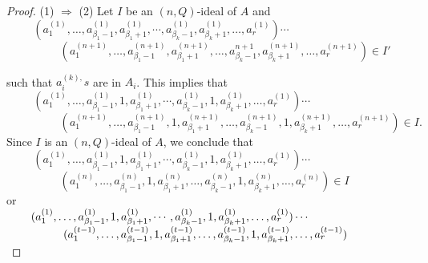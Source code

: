 \documentclass[preprint,review,10pt]{amsart}
\theoremstyle{definition}
\theoremstyle{remark}
\numberwithin{equation}{section}
\begin{document}
\begin{proof}
(1) $\Longrightarrow$ (2) Let $I$ be an $(n,Q)$-ideal of $A$ and \\

$\hspace{1cm} (a^{(1)}_1,\ldots,a^{(1)}_{\beta_1-1}, a^{(1)}_{\beta_1+1},\cdots, a^{(1)}_{\beta_k-1}, a^{(1)}_{\beta_k+1}, \dots,a_r^{(1)})\cdots$\\

$\hspace{2cm}(a^{(n+1)}_1,\ldots,a^{(n+1)}_{\beta_1-1}, a^{(n+1)}_{\beta_1+1},\ldots, a^{n+1}_{\beta_k-1}, a^{(n+1)}_{\beta_k+1},\ldots,a_r^{(n+1)}) \in I'$

such that  $a_i^{(k),}s$  are in $A_i$. This implies that\\

$\hspace{1cm} (a^{(1)}_1,\ldots,a^{(1)}_{\beta_1-1}, 1, a^{(1)}_{\beta_1+1},\cdots, a^{(1)}_{\beta_k-1}, 1,a^{(1)}_{\beta_k+1}, \dots,a_r^{(1)})\cdots$\\

$\hspace{2cm}(a^{(n+1)}_1,\ldots,a^{(n+1)}_{\beta_1-1},1, a^{(n+1)}_{\beta_1+1},\ldots, a^{(n+1)}_{\beta_k-1},1, a^{(n+1)}_{\beta_k+1},\ldots,a_r^{(n+1)}) \in I.$\\

Since $I$ is an $(n,Q)$-ideal of $A$, we conclude that\\

$\hspace{1cm} (a^{(1)}_1,\ldots,a^{(1)}_{\beta_1-1}, 1, a^{(1)}_{\beta_1+1},\cdots, a^{(1)}_{\beta_k-1}, 1,a^{(1)}_{\beta_k+1}, \dots,a_r^{(1)})\cdots$\\

$\hspace{2cm}(a^{(n)}_1,\ldots,a^{(n)}_{\beta_1-1},1, a^{(n)}_{\beta_1+1},\ldots, a^{(n)}_{\beta_k-1},1, a^{(n)}_{\beta_k+1},\ldots,a_r^{(n)}) \in I$\\

or\\

$\hspace{0.75cm} (a^{(1)}_1,\ldots,a^{(1)}_{\beta_1-1}, 1, a^{(1)}_{\beta_1+1},\cdots, a^{(1)}_{\beta_k-1}, 1,a^{(1)}_{\beta_k+1}, \dots,a_r^{(1)})\cdots$\\

$\hspace{1.75cm}(a^{(t-1)}_1,\ldots,a^{(t-1)}_{\beta_1-1},1, a^{(t-1)}_{\beta_1+1},\ldots, a^{(t-1)}_{\beta_k-1},1, a^{(t-1)}_{\beta_k+1},\ldots,a_r^{(t-1)}) $\\


\end{proof}
\end{document}
